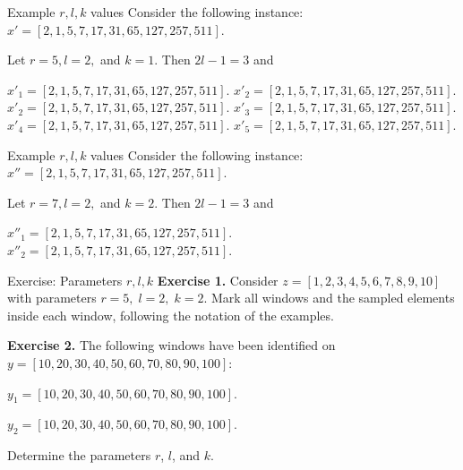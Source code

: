 \documentclass{beamer}
\begin{document}
\begin{frame}{Example \(r, l, k\) values}
    Consider the following instance: \(x' = [2, 1, 5, 7, 17, 31, 65, 127, 257, 511]\).
    
    Let \(r=5, l= 2, \) and \(k=1\). Then \(2l-1=3\) and
    \vspace{10px}
    
    \(x'_1 = [\boxed{\boxed{2}, 1, \boxed{5}, 7, \boxed{17}}, 31, 65, 127, 257, 511].\)
    \(x'_2 = [2, \boxed{\boxed{1}, 5, \boxed{7}, 17, \boxed{31}}, 65, 127, 257, 511].\)
    \(x'_2 = [2, 1, \boxed{\boxed{5}, 7, \boxed{17}, 31, \boxed{65}}, 127, 257, 511].\)
    \(x'_3 = [2, 1, 5, \boxed{\boxed{7}, 17, \boxed{31}, 65, \boxed{127}}, 257, 511].\)
    \(x'_4 = [2, 1, 5, 7, \boxed{\boxed{17}, 31, \boxed{65}, 127, \boxed{257}}, 511].\)
    \(x'_5 = [2, 1, 5, 7, 17, \boxed{\boxed{31}, 65, \boxed{127}, 257, \boxed{511}}].\)
    
\end{frame}

\begin{frame}{Example \(r, l, k\) values}
    Consider the following instance: \(x'' = [2, 1, 5, 7, 17, 31, 65, 127, 257, 511]\).
    
    Let \(r=7, l= 2, \) and \(k=2\). Then \(2l-1=3\) and
    \vspace{10px}
    
    \(x''_1 = [\boxed{\boxed{2}, 1, 5, \boxed{7}, 17, 31, \boxed{65}}, 127, 257, 511].\)
    \(x''_2 = [2, 1, \boxed{\boxed{5}, 7, 17, \boxed{31}, 65, 127, \boxed{257}}, 511].\)

    
\end{frame}

\begin{frame}{Exercise: Parameters \(r, l, k\)}
  \textbf{Exercise 1.} Consider \(z = [1, 2, 3, 4, 5, 6, 7, 8, 9, 10]\) with parameters \(r = 5,\; l = 2,\; k = 2\).
  Mark all windows and the sampled elements inside each window, following the notation of the examples.

  \vspace{1em}
  \textbf{Exercise 2.} The following windows have been identified on
  \(y = [10, 20, 30, 40, 50, 60, 70, 80, 90, 100]\):

  \vspace{0.5em}
  \(y_1 = [\boxed{\boxed{10}, 20, 30, \boxed{40}, 50, 60, \boxed{70}}, 80, 90, 100].\)

  \(y_2 = [10, 20, 30, \boxed{\boxed{40}, 50, 60, \boxed{70}, 80, 90, \boxed{100}}].\)

  \vspace{0.5em}
  Determine the parameters \(r\), \(l\), and \(k\).
\end{frame}
\end{document}
